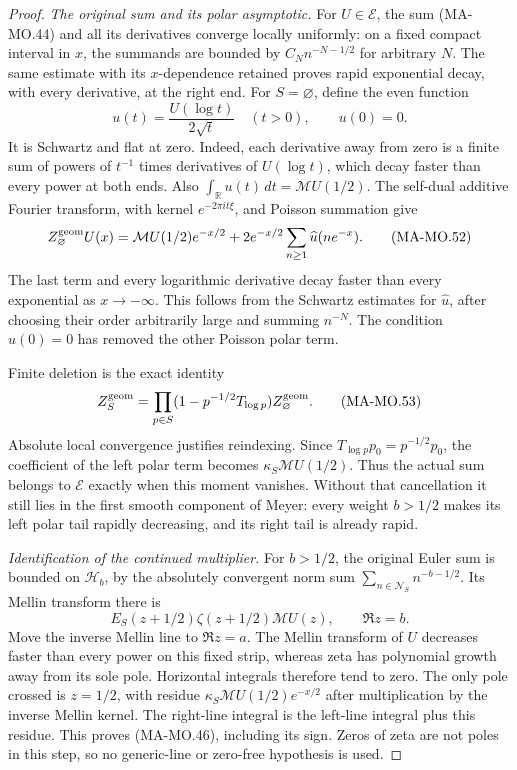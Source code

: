 \begin{proof}
\emph{The original sum and its polar asymptotic.}
For \(U\in\mathcal E\), the sum (MA-MO.44) and all its derivatives
converge locally uniformly: on a fixed compact interval in \(x\),
the summands are bounded by \(C_N n^{-N-1/2}\) for arbitrary
\(N\). The same estimate with its \(x\)-dependence retained proves
rapid exponential decay, with every derivative, at the right end.
For \(S=\varnothing\), define the even function
\[
              u(t)=\frac{U(\log t)}{2\sqrt t}\quad(t>0),
              \qquad u(0)=0.
 \tag{MA-MO.51}
\]
It is Schwartz and flat at zero. Indeed, each derivative away from
zero is a finite sum of powers of \(t^{-1}\) times derivatives
of \(U(\log t)\), which decay faster than every power at both
ends. Also \(\int_{\mathbb R}u(t)\,dt=\mathcal MU(1/2)\).
The self-dual additive Fourier transform, with kernel
\(e^{-2\pi it\xi}\), and Poisson summation give
\[
 Z_\varnothing^{\rm geom}U(x)
   =\mathcal MU(1/2)e^{-x/2}
       +2e^{-x/2}\sum_{n\ge1}\widehat u(ne^{-x}).
 \tag{MA-MO.52}
\]
The last term and every logarithmic derivative decay faster than
every exponential as \(x\to-\infty\). This follows from the
Schwartz estimates for \(\widehat u\), after choosing their order
arbitrarily large and summing \(n^{-N}\). The condition \(u(0)=0\)
has removed the other Poisson polar term.

Finite deletion is the exact identity
\[
 Z_S^{\rm geom}
    =\prod_{p\in S}(1-p^{-1/2}T_{\log p})
                         Z_\varnothing^{\rm geom}.
 \tag{MA-MO.53}
\]
Absolute local convergence justifies reindexing. Since
\(T_{\log p}p_0=p^{-1/2}p_0\), the coefficient of the left polar
term becomes \(\kappa_S\mathcal MU(1/2)\). Thus the actual sum
belongs to \(\mathcal E\) exactly when this moment vanishes.
Without that cancellation it still lies in the first smooth
component of Meyer: every weight \(b>1/2\) makes its left polar
tail rapidly decreasing, and its right tail is already rapid.

\emph{Identification of the continued multiplier.}
For \(b>1/2\), the original Euler sum is bounded on
\(\mathcal H_b\), by the absolutely convergent norm sum
\(\sum_{n\in\mathcal N_S}n^{-b-1/2}\). Its Mellin transform there is
\[
 E_S(z+1/2)\zeta(z+1/2)\mathcal MU(z),\qquad \Re z=b.
 \tag{MA-MO.54}
\]
Move the inverse Mellin line to \(\Re z=a\). The Mellin transform
of \(U\) decreases faster than every power on this fixed strip,
whereas zeta has polynomial growth away from its sole pole.
Horizontal integrals therefore tend to zero. The only pole crossed
is \(z=1/2\), with residue
\(\kappa_S\mathcal MU(1/2)e^{-x/2}\) after multiplication by
the inverse Mellin kernel. The right-line integral is the
left-line integral plus this residue. This proves (MA-MO.46),
including its sign. Zeros of zeta are not poles in this step,
so no generic-line or zero-free hypothesis is used.


\end{proof}
